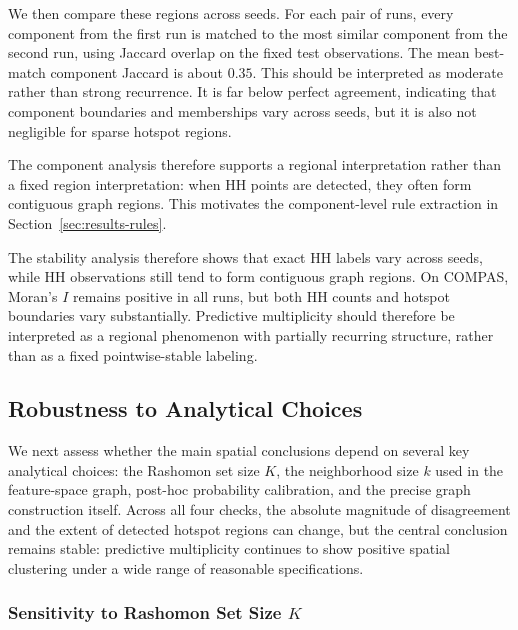 We then compare these regions across seeds. For each pair of runs, every component from
the first run is matched to the most similar component from the second run, using Jaccard
overlap on the fixed test observations. The mean best-match component Jaccard is about $0.35$. 
This should be interpreted as moderate rather than strong recurrence. It is far below perfect 
agreement, indicating that component boundaries and memberships vary across seeds, but it is 
also not negligible for sparse hotspot regions.

The component analysis therefore supports a regional interpretation rather than a fixed region
interpretation: when HH points are detected, they often form contiguous graph regions. This
motivates the component-level rule extraction in Section~\ref{sec:results-rules}.

The stability analysis therefore shows that exact HH labels vary across seeds, while
HH observations still tend to form contiguous graph regions. On COMPAS, Moran's $I$ remains 
positive in all runs, but both HH counts and hotspot boundaries vary substantially. Predictive
multiplicity should therefore be interpreted as a regional phenomenon with partially recurring 
structure, rather than as a fixed pointwise-stable labeling.



\subsection{Robustness to Analytical Choices}
\label{sec:results-robustness}

We next assess whether the main spatial conclusions depend on several key analytical choices: 
the Rashomon set size $K$, the neighborhood size $k$ used in the feature-space graph, post-hoc 
probability calibration, and the precise graph construction itself. Across all four checks, the
absolute magnitude of disagreement and the extent of detected hotspot
regions can change, but the central conclusion remains stable: predictive multiplicity continues
to show positive spatial clustering under a wide range of reasonable specifications.

\subsubsection{Sensitivity to Rashomon Set Size \texorpdfstring{$K$}{K}}
\label{sec:results-sensitivity-K}

